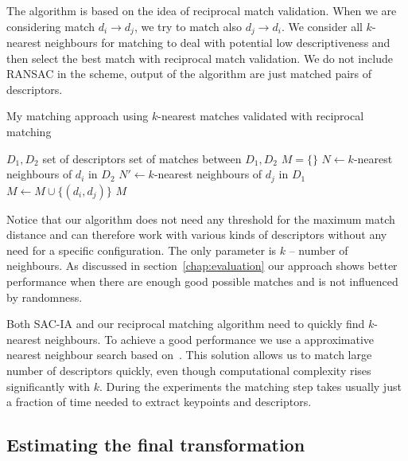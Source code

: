 The algorithm is based on the idea of reciprocal match validation. When we are considering match $d_i \rightarrow d_j$, we try to match also $d_j \rightarrow d_i$. We consider all $k$-nearest neighbours for matching to deal with potential low descriptiveness and then select the best match with reciprocal match validation. We do not include \gls{RANSAC} in the scheme, output of the algorithm are just matched pairs of descriptors.

\begin{algorithm}
    \caption[Reciprocal $k$-nearest matching]{My matching approach using $k$-nearest matches validated with reciprocal matching}
    \label{alg:cross-match}
    \begin{algorithmic}[1]
        \Require $D_1, D_2$ set of descriptors
        \Ensure set of matches between $D_1, D_2$
            \State $M = \{\}$
                \State $N \gets k$-nearest neighbours of $d_i$ in $D_2$
                    \State $N' \gets k$-nearest neighbours of $d_j$ in $D_1$
                        \State $M \gets M \cup \{(d_i, d_j)\}$
                    \EndIf
                \EndFor
            \EndFor
            \State \Return $M$
        \EndFunction
    \end{algorithmic}
\end{algorithm}

Notice that our algorithm does not need any threshold for the maximum match distance and can therefore work with various kinds of descriptors without any need for a specific configuration. The only parameter is $k$ -- number of neighbours. As discussed in section~\ref{chap:evaluation} our approach shows better performance when there are enough good possible matches and is not influenced by randomness.

Both \gls{SAC-IA} and our reciprocal matching algorithm need to quickly find $k$-nearest neighbours. To achieve a good performance we use a approximative nearest neighbour search based on~\citet{muja2014flann}. This solution allows us to match large number of descriptors quickly, even though computational complexity rises significantly with $k$. During the experiments the matching step takes usually just a fraction of time needed to extract keypoints and descriptors.

\subsection{Estimating the final transformation}

